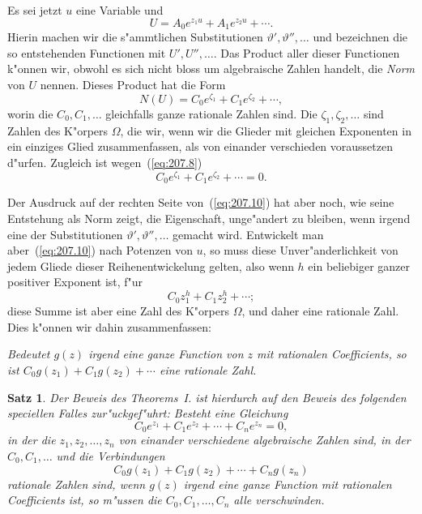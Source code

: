 \documentclass[10pt,a4paper]{article}
\theoremstyle{weberstyle}
\newtheorem{satz}{Satz}[section]
\begin{document}
Es sei jetzt $u$ eine Variable und
\begin{equation}\label{eq:207.9}
U = A_0e^{z_1u} + A_1e^{z_2u} + \cdots.
\end{equation}
Hierin machen wir die s"ammtlichen Substitutionen
$\vartheta',\vartheta'',\dots$ und bezeichnen die so entstehenden Functionen
mit $U',U'',\dots$. Das Product aller dieser Functionen k"onnen wir,
obwohl es sich nicht bloss um algebraische Zahlen handelt, die \emph{Norm}
von $U$ nennen. Dieses Product hat die Form
\begin{equation}\label{eq:207.10}
N(U) = C_0e^{\zeta_1} + C_1e^{\zeta_2} + \cdots,
\end{equation}
worin die $C_0,C_1,\dots$ gleichfalls ganze rationale Zahlen sind. Die
$\zeta_1,\zeta_2,\dots$ sind Zahlen des K"orpers $\Omega$, die wir, wenn wir
die Glieder mit gleichen Exponenten in ein einziges Glied zusammenfassen,
als von einander verschieden voraussetzen d"urfen. Zugleich ist
wegen~(\ref{eq:207.8})
\begin{equation}\label{eq:207.11}
C_0e^{\zeta_1} + C_1e^{\zeta_2} + \cdots = 0.
\end{equation}

Der Ausdruck auf der rechten Seite von~(\ref{eq:207.10}) hat aber noch,
wie seine Entstehung als Norm zeigt, die Eigenschaft, unge"andert zu
bleiben, wenn irgend eine der Substitutionen $\vartheta',\vartheta'',\dots$
gemacht wird. Entwickelt man aber~(\ref{eq:207.10}) nach Potenzen von
$u$, so muss diese Unver"anderlichkeit von jedem Gliede dieser
Reihenentwickelung gelten, also wenn $h$ ein beliebiger ganzer positiver
Exponent ist, f"ur
\[
C_0z_1^h + C_1z_2^h + \cdots;
\]
diese Summe ist aber eine Zahl des K"orpers $\Omega$, und daher eine
rationale Zahl. Dies k"onnen wir dahin zusammenfassen:
\begin{center}
\textit{Bedeutet $g(z)$ irgend eine ganze Function von $z$ mit rationalen
Coefficients, so ist $C_0g(z_1)+C_1g(z_2)+\cdots$ eine rationale Zahl.}
\end{center}

\begin{satz}
Der Beweis des Theorems~I. ist hierdurch auf den Beweis des
folgenden speciellen Falles zur"uckgef"uhrt: Besteht eine Gleichung
\begin{equation}\label{eq:207.12}
C_0e^{z_1} + C_1e^{z_2} + \cdots + C_ne^{z_n} = 0,
\end{equation}
in der die $z_1,z_2,\dots,z_n$ von einander verschiedene algebraische
Zahlen sind, in der $C_0,C_1,\dots$ und die Verbindungen
\begin{equation}\label{eq:207.13}
C_0g(z_1) + C_1g(z_2) + \cdots + C_ng(z_n)
\end{equation}
rationale Zahlen sind, wenn $g(z)$ irgend eine ganze Function mit
rationalen Coefficients ist, so m"ussen die $C_0,C_1,\dots,C_n$ alle
verschwinden.
\end{satz}
\end{document}
